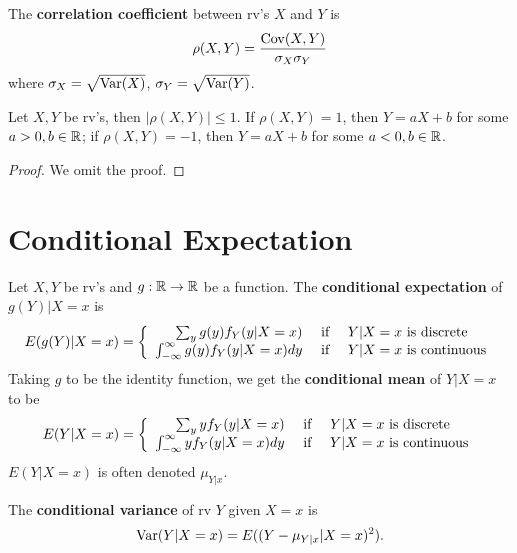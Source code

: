 \documentclass[11pt,fleqn]{book} %
\begin{document}
\begin{definition} \label{def:2613}
The \textbf{correlation coefficient} between rv's \(X\) and \(Y\) is
\[
\rho(X, Y) = \frac{\operatorname{Cov}(X, Y)}{\sigma_X\sigma_Y}
\]
where \(\sigma_X = \sqrt{\operatorname{Var}(X)}\), \(\sigma_Y = \sqrt{\operatorname{Var}(Y)}\).
\end{definition}

\begin{theorem} Let \(X, Y\) be rv's, then \(|\rho(X, Y)| \leq 1\). If \(\rho(X, Y) = 1\), then \(Y = aX + b\) for some \(a > 0, b \in \mathbb{R}\); if \(\rho(X, Y) = -1\), then \(Y = aX + b\) for some \(a < 0, b \in \mathbb{R}\).
\end{theorem}
\begin{proof}
We omit the proof.
\end{proof}


\section{Conditional Expectation}

\begin{definition} 
Let \(X, Y\) be rv's and \(g:\mathbb{R} \rightarrow \mathbb{R}\) be a function. The \textbf{conditional expectation} of \(g(Y)|X = x\) is
\[
E(g(Y)|X = x) = 
\left\{
\begin{array}{rcl}
\sum_y g(y)f_Y(y|X = x) & \text{ if } & Y|X = x \text{ is discrete} \\
\int_{-\infty}^\infty g(y)f_Y(y|X = x)dy & \text{ if } & Y|X = x \text{ is continuous}
\end{array}
\right.
\]
\indent Taking \(g\) to be the identity function, we get the \textbf{conditional mean} of \(Y|X = x\) to be
\[
E(Y|X = x) = 
\left\{
\begin{array}{rcl}
\sum_y yf_Y(y|X = x) & \text{ if } & Y|X = x \text{ is discrete} \\
\int_{-\infty}^\infty yf_Y(y|X = x)dy & \text{ if } & Y|X = x \text{ is continuous}
\end{array}
\right.
\]
\indent \(E(Y|X = x)\) is often denoted \(\mu_{Y|x}\).
\end{definition}

\begin{definition} 
The \textbf{conditional variance} of rv \(Y\) given \(X = x\) is
\[
\operatorname{Var}(Y|X = x) = E((Y - \mu_{Y|x}|X = x)^2).
\]
\end{definition}
\end{document}
